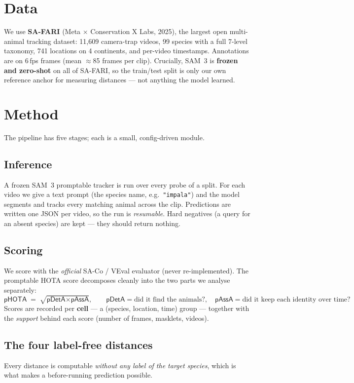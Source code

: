 \documentclass[11pt]{article}
\newcommand{\pdeta}{\textsf{pDetA}}
\newcommand{\passa}{\textsf{pAssA}}
\newcommand{\phota}{\textsf{pHOTA}}
\begin{document}
\section{Data}
We use \textbf{SA-FARI} (Meta $\times$ Conservation X Labs, 2025), the largest open multi-animal tracking
dataset: 11{,}609 camera-trap videos, 99 species with a full 7-level taxonomy, 741 locations on 4
continents, and per-video timestamps. Annotations are on 6\,fps frames (mean $\approx$85 frames per clip).
Crucially, SAM~3 is \textbf{frozen and zero-shot} on all of SA-FARI, so the train/test split is only our
own reference anchor for measuring distances --- not anything the model learned.

\section{Method}
The pipeline has five stages; each is a small, config-driven module.

\subsection{Inference}
A frozen SAM~3 promptable tracker is run over every probe of a split. For each video we give a text prompt
(the species name, e.g.\ \texttt{"impala"}) and the model segments and tracks every matching animal across
the clip. Predictions are written one JSON per video, so the run is \emph{resumable}. Hard negatives
(a query for an absent species) are kept --- they should return nothing.

\subsection{Scoring}
We score with the \emph{official} SA-Co / VEval evaluator (never re-implemented). The promptable HOTA
score decomposes cleanly into the two parts we analyse separately:
\[
  \phota{} \;=\; \sqrt{\pdeta{} \times \passa{}}, \qquad
  \pdeta{} = \text{did it find the animals?}, \quad
  \passa{} = \text{did it keep each identity over time?}
\]
Scores are recorded per \textbf{cell} --- a (species, location, time) group --- together with the
\emph{support} behind each score (number of frames, masklets, videos).

\subsection{The four label-free distances}
Every distance is computable \emph{without any label of the target species}, which is what makes a
before-running prediction possible.
\end{document}
